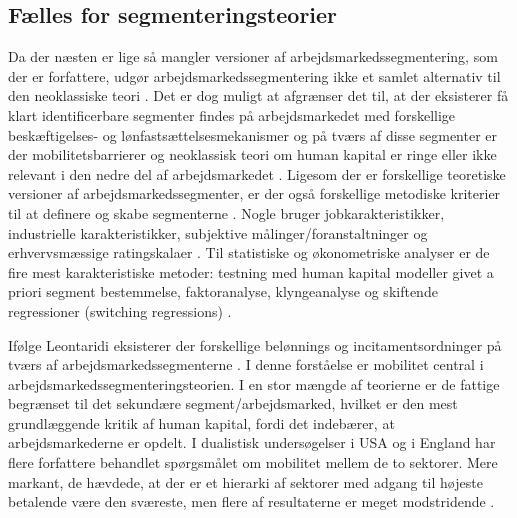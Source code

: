 \subsection{Fælles for segmenteringsteorier}

Da der næsten er lige så mangler versioner af arbejdsmarkedssegmentering, som der er forfattere, udgør arbejdsmarkedssegmentering ikke et samlet alternativ til den neoklassiske teori \parencite[77]{Leontaridi1998}. Det er dog muligt at afgrænser det til, at der eksisterer få klart identificerbare segmenter findes på arbejdsmarkedet med forskellige beskæftigelses- og lønfastsættelsesmekanismer og på tværs af disse segmenter er der mobilitetsbarrierer og neoklassisk teori om human kapital er ringe eller ikke relevant i den nedre del af arbejdsmarkedet \parencite[78]{Leontaridi1998}. Ligesom der er forskellige teoretiske versioner af arbejdsmarkedssegmenter, er der også forskellige metodiske kriterier til at definere og skabe segmenterne \parencite[78]{Leontaridi1998}. Nogle bruger jobkarakteristikker, industrielle karakteristikker, subjektive målinger/foranstaltninger og erhvervsmæssige ratingskalaer \parencite[79]{Leontaridi1998}. Til statistiske og økonometriske analyser er de fire mest karakteristiske metoder: testning med human kapital modeller givet a priori segment bestemmelse, faktoranalyse, klyngeanalyse og skiftende regressioner (switching regressions) \parencite[80]{Leontaridi1998}.

Ifølge Leontaridi eksisterer der forskellige belønnings
og incitamentsordninger på tværs af arbejdsmarkedssegmenterne \parencite[92]{Leontaridi1998}. I denne forståelse er mobilitet central i arbejdsmarkedssegmenteringsteorien. I en stor mængde af teorierne er de fattige begrænset til det sekundære segment/arbejdsmarked, hvilket er den mest grundlæggende kritik af human kapital, fordi det indebærer, at arbejdsmarkederne er opdelt. I dualistisk undersøgelser i USA og i England har flere forfattere behandlet spørgsmålet om mobilitet mellem de to sektorer. Mere markant, de hævdede, at der er et hierarki af sektorer med adgang til højeste betalende være den sværeste, men flere af resultaterne er meget modstridende \parencite[93]{Leontaridi1998}.

